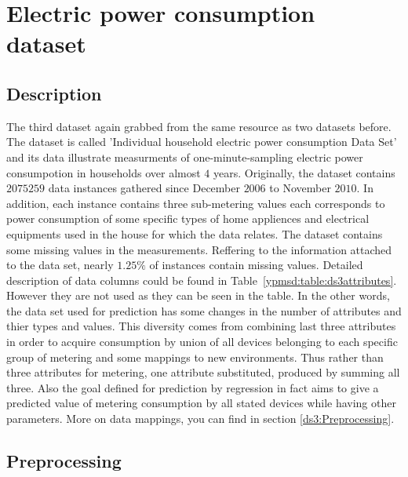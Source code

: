 \section{Electric power consumption dataset}
\subsection{Description}
The third dataset again grabbed from the same resource as two datasets before.
The dataset is called 'Individual household electric power consumption Data
Set\cite{ds:household}' and its data illustrate measurments of
one-minute-sampling electric power consumpotion in households over almost $4$
years. Originally, the dataset contains $2075259$ data instances gathered since
December $2006$ to November $2010$. In addition, each instance contains three
sub-metering values each corresponds to power consumption of some specific types
of home appliences and electrical equipments used in the house for which the
data relates. The dataset contains some missing values in the measurements.
Reffering to the information attached to the data set, nearly $1.25\%$ of
instances contain missing values. Detailed description of data columns could be
found in Table~\ref{ypmsd:table:ds3attributes}.\\
However they are not used as they can be seen in the table. In the other words,
the data set used for prediction has some changes in the number of attributes
and thier types and values.
This diversity comes from combining last three attributes in order to acquire consumption by union of all devices
belonging to each specific group of metering and some mappings to new
environments.
Thus rather than three attributes for metering, one attribute substituted, produced by summing all three. Also the
goal defined for prediction by regression in fact aims to give a predicted value
of metering consumption by all stated devices while having other parameters.
More on data mappings, you can find in section \ref{ds3:Preprocessing}.








\subsection{Preprocessing\label{ds3:Preprocessing}}

